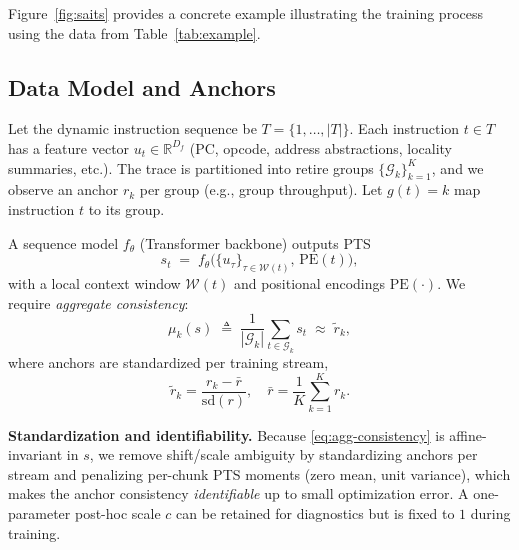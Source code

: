 Figure~\ref{fig:saits} provides a concrete example illustrating the training process using the data from Table~\ref{tab:example}.
\begin{table}[!htbp]
\centering
\small
\caption{Example of profiled dataset from an initial simulation  with group \emph{anchors} for training.}
\label{tab:example}
\end{table}


\subsection{Data Model and Anchors}
Let the dynamic instruction sequence be \(T=\{1,\ldots,|T|\}\). Each instruction \(t\in T\) has a feature vector \(u_t\in\mathbb{R}^{D_f}\) (PC, opcode, address abstractions, locality summaries, etc.). The trace is partitioned into retire groups \(\{\mathcal{G}_k\}_{k=1}^{K}\), and we observe an anchor \(r_k\) per group (e.g., group throughput). Let \(g(t)=k\) map instruction \(t\) to its group.

A sequence model \(f_\theta\) (Transformer backbone) outputs PTS
\[
s_t \;=\; f_\theta\!\Big(\{u_\tau\}_{\tau\in\mathcal{W}(t)},\,\mathrm{PE}(t)\Big),
\]
with a local context window \(\mathcal{W}(t)\) and positional encodings \(\mathrm{PE}(\cdot)\). We require \emph{aggregate consistency}:
\begin{equation}
\label{eq:agg-consistency}
\mu_k(s)\;\triangleq\;\frac{1}{|\mathcal{G}_k|}\sum_{t\in\mathcal{G}_k} s_t \;\approx\; \tilde{r}_k,
\end{equation}
where anchors are standardized per training stream,
\[
\tilde{r}_k=\frac{r_k-\bar{r}}{\mathrm{sd}(r)},\quad \bar{r}=\frac{1}{K}\sum_{k=1}^K r_k.
\]

\textbf{Standardization and identifiability.}
Because \eqref{eq:agg-consistency} is affine-invariant in $s$, we remove shift/scale ambiguity by standardizing anchors per stream and penalizing per-chunk PTS moments (zero mean, unit variance), which makes the anchor consistency \emph{identifiable} up to small optimization error. A one-parameter post-hoc scale \(c\) can be retained for diagnostics but is fixed to \(1\) during training.

